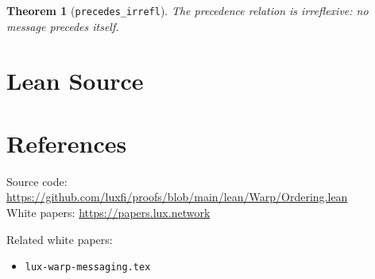 \documentclass[11pt]{article}
\newtheorem{theorem}{Theorem}
\begin{document}
\begin{theorem}[\texttt{precedes\_irrefl}]
The precedence relation is irreflexive: no message precedes itself.
\end{theorem}


\section{Lean Source}


\section{References}
\noindent Source code: \url{https://github.com/luxfi/proofs/blob/main/lean/Warp/Ordering.lean}\\
\noindent White papers: \url{https://papers.lux.network}

\noindent Related white papers:
\begin{itemize}
  \item \texttt{lux-warp-messaging.tex}
\end{itemize}
\end{document}
